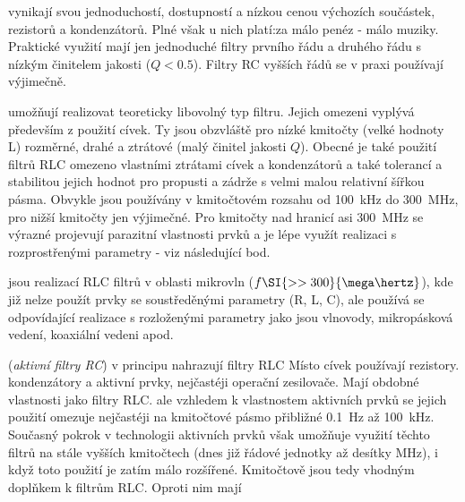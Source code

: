       \begin{description}[noitemsep, font=\small]
        \item[\textbf{Filtry RC}] vynikají svou jednoduchostí, dostupností a nízkou cenou výchozích
              součástek, rezistorů a kondenzátorů. Plné však u nich platí:za málo penéz - málo
              muziky. Praktické využití mají jen jednoduché filtry prvního řádu a druhého řádu s
              nízkým činitelem jakosti (\(Q < \num{0.5}\)). Filtry RC vyšších řádů se v praxi
              používají výjimečně.
        \item[\textbf{Filtry RLC}] umožňují realizovat teoreticky libovolný typ filtru. Jejich
              omezeni vyplývá především z použití cívek. Ty jsou obzvláště pro nízké kmitočty
              (velké hodnoty L) rozměrné, drahé a ztrátové (malý činitel jakosti \(Q\)). Obecné je
              také použití filtrů RLC omezeno vlastními ztrátami cívek a kondenzátorů a také
              tolerancí a stabilitou jejich hodnot pro propusti a zádrže s velmi malou relativní
              šířkou pásma. Obvykle jsou používány v kmitočtovém rozsahu od \SI{100}{\kilo\hertz}
              do \SI{300}{\mega\hertz}, pro nižší kmitočty jen výjimečné. Pro kmitočty nad
              hranicí asi \SI{300}{\mega\hertz} se výrazné projevují parazitní vlastnosti prvků a
              je lépe využít realizaci s rozprostřenými parametry - viz následující bod.
        \item[\textbf{Mikrovlnné filtry}] jsou realizací RLC filtrů v oblasti mikrovln (\(f
              \SI{>>300}{\mega\hertz}\)), kde již nelze použít prvky se soustředěnými parametry
              (R, L, C), ale používá se odpovídající realizace s rozloženými parametry jako jsou
              vlnovody, mikropásková vedení, koaxiální vedeni apod.
        \item[\textbf{Filtry ARC}] (\emph{aktivní filtry RC}) v principu nahrazují filtry RLC
              Místo cívek používají rezistory. kondenzátory a aktivní prvky, nejčastéji operační
              zesilovače. Mají obdobné vlastnosti jako filtry RLC. ale vzhledem k vlastnostem
              aktivních prvků se jejich použití omezuje nejčastéji na kmitočtové pásmo přibližné
              \SI{0.1}{\hertz} až \SI{100}{\kilo\hertz}. Současný pokrok v technologii aktivních
              prvků však umožňuje využití těchto filtrů na stále vyšších kmitočtech (dnes již
              řádové jednotky až desítky \si{\mega\hertz}), i když toto použití je zatím málo
              rozšířené. Kmitočtově jsou tedy vhodným doplňkem k filtrům RLC. Oproti nim mají

\end{description}

